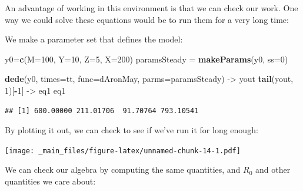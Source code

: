 \documentclass[
]{book}
\newenvironment{Shaded}{\begin{snugshade}}{\end{snugshade}}
\newcommand{\AttributeTok}[1]{\textcolor[rgb]{0.13,0.29,0.53}{#1}}
\newcommand{\DecValTok}[1]{\textcolor[rgb]{0.00,0.00,0.81}{#1}}
\newcommand{\FunctionTok}[1]{\textcolor[rgb]{0.13,0.29,0.53}{\textbf{#1}}}
\newcommand{\NormalTok}[1]{#1}
\newcommand{\OtherTok}[1]{\textcolor[rgb]{0.56,0.35,0.01}{#1}}
\newcommand{\SpecialCharTok}[1]{\textcolor[rgb]{0.81,0.36,0.00}{\textbf{#1}}}
\begin{document}
An advantage of working in this environment is that we can check our work. One way we could solve these equations would be to run them for a very long time:

We make a parameter set that defines the model:

\begin{Shaded}
\begin{Highlighting}[]
\NormalTok{y0}\OtherTok{=}\FunctionTok{c}\NormalTok{(}\AttributeTok{M=}\DecValTok{100}\NormalTok{, }\AttributeTok{Y=}\DecValTok{10}\NormalTok{, }\AttributeTok{Z=}\DecValTok{5}\NormalTok{, }\AttributeTok{X=}\DecValTok{200}\NormalTok{)}
\NormalTok{paramsSteady }\OtherTok{=} \FunctionTok{makeParams}\NormalTok{(y0, }\AttributeTok{ss=}\DecValTok{0}\NormalTok{)}
\end{Highlighting}
\end{Shaded}

\begin{Shaded}
\begin{Highlighting}[]
\FunctionTok{dede}\NormalTok{(y0, }\AttributeTok{times=}\NormalTok{tt, }\AttributeTok{func=}\NormalTok{dAronMay, }\AttributeTok{parms=}\NormalTok{paramsSteady) }\OtherTok{{-}\textgreater{}}\NormalTok{ yout}
\FunctionTok{tail}\NormalTok{(yout, }\DecValTok{1}\NormalTok{)[}\SpecialCharTok{{-}}\DecValTok{1}\NormalTok{] }\OtherTok{{-}\textgreater{}}\NormalTok{ eq1 }
\NormalTok{eq1}
\end{Highlighting}
\end{Shaded}

\begin{verbatim}
## [1] 600.00000 211.01706  91.70764 793.10541
\end{verbatim}

By plotting it out, we can check to see if we've run it for long enough:

\texttt{[image: \_main\_files/figure-latex/unnamed-chunk-14-1.pdf]}

We can check our algebra by computing the same quantities, and \(R_0\) and other quantities we care about:
\end{document}
